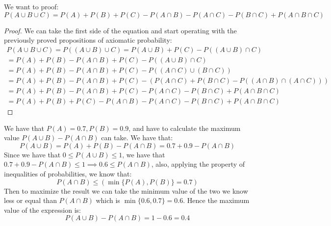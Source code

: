 \documentclass{article}
\begin{document}
    \begin{minipage}{\linewidth}
        \begin{solutions}
            We want to proof: 
            \[
                P(A \cup B \cup C) = P(A) + P(B) + P(C) - P(A \cap B) - P(A \cap C) - P(B \cap C) + P(A \cap B \cap C)
            \]
            \begin{proof}
                We can take the first side of the equation and start operating with the previously proved propositions of axiomatic probability: 
                \begin{gather*}
                    P(A \cup B \cup C) = P((A \cup B) \cup C) = P(A \cup B) + P(C) - P((A \cup B) \cap C)\\ 
                    = P(A) + P(B) - P(A \cap B) + P(C) - P((A \cup B) \cap C)\\
                    = P(A) + P(B) - P(A \cap B) + P(C) - P((A \cap C) \cup (B \cap C))\\
                    = P(A) + P(B) - P(A \cap B) + P(C) - (P(A \cap C) + P(B \cap C) - P((A \cap B) \cap (A \cap C)))\\
                    = P(A) + P(B) - P(A \cap B) + P(C) - P(A \cap C) - P(B \cap C) + P(A \cap B \cap C)\\
                    = P(A) + P(B) + P(C)- P(A \cap B) - P(A \cap C) - P(B \cap C) + P(A \cap B \cap C)
                \end{gather*}
            \end{proof}
            \medskip
        \end{solutions}
    \end{minipage}
    \begin{minipage}{\linewidth}
        \begin{solutions}
            We have that $P(A) = 0.7, P(B) = 0.9$, and have to calculate the maximum value $P(A \cup B) - P(A \cap B)$ can take. 
            We have that:
            \[
                P(A \cup B) = P(A) + P(B) - P(A \cap B) = 0.7 + 0.9 - P(A \cap B)
            \]
            Since we have that $0 \leq P(A \cup B) \leq 1$, we have that $0.7 + 0.9 - P(A \cap B) \leq 1 \implies 0.6 \leq P(A \cap B)$, also, applying the property of inequalities of probabilities, we know that:
            \[
                P(A \cap B) \leq (\min{\{P(A), P(B)\}} = 0.7)
            \]
            Then to maximize the result we can take the minimum value of the two we know less or equal than $P(A \cap B)$ which is $\min{\{0.6, 0.7\}} = 0.6$. Hence the maximum value of the expression is:
            \[
                P(A \cup B) - P(A \cap B) = 1 - 0.6 = 0.4
            \]
            \medskip
        \end{solutions}
    \end{minipage}
\end{document}
